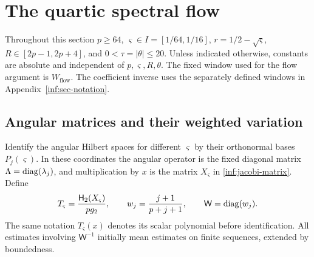 \section{The quartic spectral flow}\label{inf:sec-flow}

Throughout this section $p\ge64$, $\varsigma\in I=[1/64,1/16]$,
$r=1/2-\sqrt \varsigma$, $R\in[2p-1,2p+4]$, and $0<\tau=|\theta|\le20$.
Unless indicated otherwise, constants are absolute and independent of
$p,\varsigma,R,\theta$. The fixed window used for the flow argument is
$W_{\mathrm{flow}}$. The coefficient inverse uses the separately
defined windows in Appendix~\ref{inf:sec-notation}.

\subsection{Angular matrices and their weighted variation}

Identify the angular Hilbert spaces for different $\varsigma$ by their
orthonormal bases $P_j(\varsigma)$. In these coordinates the angular operator
is the fixed diagonal matrix $\Lambda=\operatorname{diag}(\lambda_j)$, and
multiplication by $x$ is the matrix $X_\varsigma$ in
\eqref{inf:jacobi-matrix}. Define
\[
 T_\varsigma=\frac{\mathsf H_2(X_\varsigma)}{pg_2},\qquad
 w_j=\frac{j+1}{p+j+1},\qquad \mathsf W=\operatorname{diag}(w_j).
\]
The same notation $T_\varsigma(x)$ denotes its scalar polynomial before
identification. All estimates involving $\mathsf W^{-1}$ initially
mean estimates on finite sequences, extended by boundedness.

